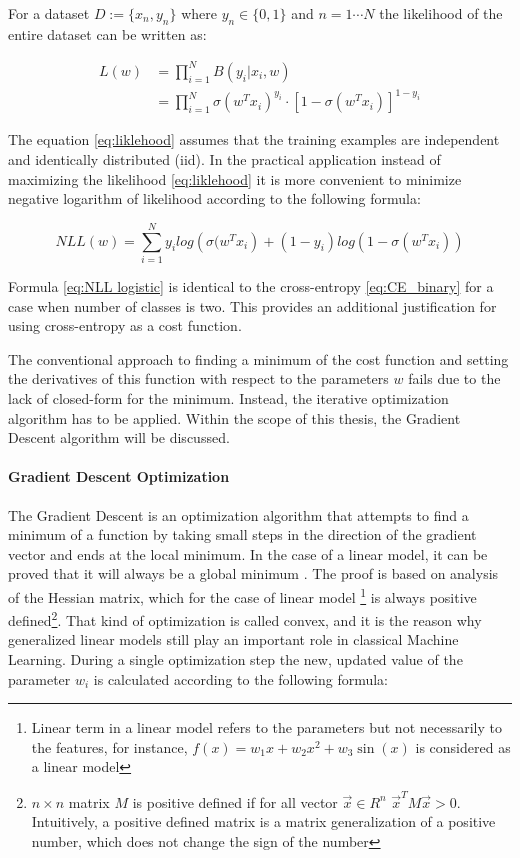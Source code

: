 For a dataset $D:=\{x_{n}, y_n\}$ where $y_{n} \in \{0,1\}$ and $n=1 \cdots N$ the likelihood of the entire dataset can be written as: 

\begin{align}
\label{eq:liklehood}
        L(w) &= \prod_{i=1}^{N} B(y_i|x_i, w) \nonumber \\
        &= \prod_{i=1}^{N} \sigma(w^{T}x_i)^{y_i}\cdot \left[1- \sigma(w^{T}x_i) \right]^{1-y_i}
\end{align}

The equation \ref{eq:liklehood} assumes that the training examples are independent and identically distributed (iid). In the practical application instead of maximizing the likelihood \ref{eq:liklehood} it is more convenient to minimize negative logarithm of likelihood according to the following formula:

\begin{equation}
\label{eq:NLL logistic}
    NLL(w) = \sum_{i=1}^{N}y_{i}log\left( \sigma(w^{T}x_{i}\right)+(1-y_i)log(1-\sigma(w^{T}x_{i}))
\end{equation}

Formula \ref{eq:NLL logistic} is identical to the cross-entropy \ref{eq:CE_binary} for a case when number of classes is two. This provides an additional justification for using cross-entropy as a cost function. 

The conventional approach to finding a minimum of the cost function and setting the derivatives of this function with respect to the parameters $w$ fails due to the lack of closed-form for the minimum. Instead, the iterative optimization algorithm has to be applied. Within the scope of this thesis, the Gradient Descent algorithm will be discussed.    

\paragraph{Gradient Descent Optimization} \mbox{}

The Gradient Descent is an optimization algorithm that attempts to find a minimum of a function by taking small steps in the direction of the gradient vector and ends at the local minimum. In the case of a linear model, it can be proved that it will always be a global minimum \cite{bishop}. The proof is based on analysis of the Hessian matrix, which for the case of linear model \footnote{Linear term in a linear model refers to the parameters but not necessarily to the features, for instance, $f(x)=w_1x+w_2x^2 + w_3 \sin(x)$ is considered as a linear model} is always positive defined\footnote{$n \times n$ matrix $M$ is positive defined if for all vector $\vec{x} \in R^{n}$ $\vec{x}^{T}M\vec{x} > 0$. Intuitively, a positive defined matrix is a matrix generalization of a positive number, which does not change the sign of the number}. 
That kind of optimization is called convex, and it is the reason why generalized linear models still play an important role in classical Machine Learning.  
During a single optimization step the new, updated value of the parameter $w_i$ is calculated according to the following formula: 

